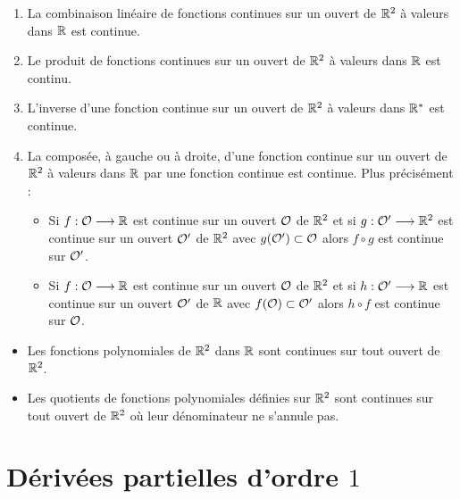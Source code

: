 \begin{prop}
    \begin{enumerate}
        \item La combinaison linéaire de fonctions continues sur un ouvert de \(\R^2\) à valeurs dans \(\R\) est continue.
        \item Le produit de fonctions continues sur un ouvert de \( \R^2\) à valeurs dans \(\R\) est continu.
        \item L’inverse d’une fonction continue sur un ouvert de \(\R^2\) à valeurs dans \(\Rs\) est continue.
        \item La composée, à gauche ou à droite, d’une fonction continue sur un ouvert de \(\R^2\) à valeurs dans \(\R\) par une fonction continue est continue. Plus précisément :
        \begin{itemize}
            \item Si \(f : \cal{O} \to  \R\) est continue sur un ouvert \(\cal{O}\) de \(\R^2\) et si \(g : \cal{O}' \to  \R^2\) est continue sur un ouvert \(\cal{O}'\) de \(\R^2\) avec \(g(\cal{O}') \subset \cal{O}\) alors \(f \circ g\) est continue sur \(\cal{O}'\).
            \item Si \(f : \cal{O} \to  \R\) est continue sur un ouvert \(\cal{O}\) de \(\R^2\) et si \(h : \cal{O}' \to  \R\) est continue sur un ouvert \(\cal{O}'\) de \(\R\) avec \(f (\cal{O}) \subset \cal{O}'\) alors \(h \circ f\) est continue sur \(\cal{O}\).
        \end{itemize}
    \end{enumerate}
\end{prop}
\begin{ex}
    \begin{itemize}
        \item Les fonctions polynomiales de \(\R^2\) dans \(\R\) sont continues sur tout ouvert de \(\R^2\).
        \item Les quotients de fonctions polynomiales définies sur \(\R^2\) sont continues sur tout ouvert de \(\R^2\) où leur dénominateur ne s’annule pas.
    \end{itemize}
\end{ex}
\section{Dérivées partielles d’ordre \(1\)}
